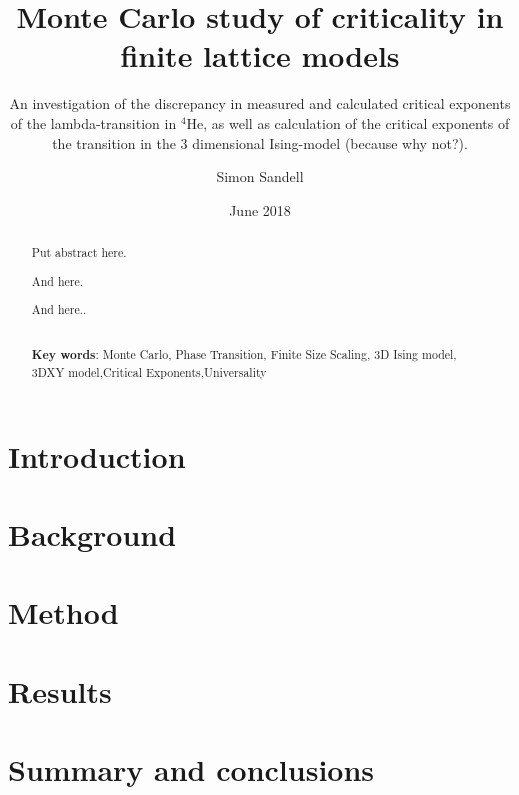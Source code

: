 \documentclass[nocoverpage,swedish,g5paper]{thesis}
\title{Monte Carlo study of criticality in finite lattice models}
\author{Simon Sandell}
\date{June 2018}
\subtitle{An investigation of the discrepancy in measured and calculated critical exponents of the lambda-transition in $^{4}$He, as well as calculation of the critical exponents of the transition in the 3 dimensional Ising-model (because why not?).}
\newcommand{\todo}[1]{(\textbf{TODO:} #1)}
\begin{document}

\begin{abstract}
Put abstract here.

And here.

And here..
\\\noindent \strut \\
{\bf Key words}: Monte Carlo, Phase Transition, Finite Size Scaling, 3D Ising model, 3DXY model,Critical Exponents,Universality
\end{abstract}


\begin{preface}

\end{preface}

\tableofcontents

\mainmatter

\chapter{Introduction}


\chapter{Background}\label{ch:Background}


\chapter{Method}\label{ch:Method}


\chapter{Results}\label{ch:Results}


\chapter{Summary and conclusions}\label{ch:Summary}





%





%
\end{document}
